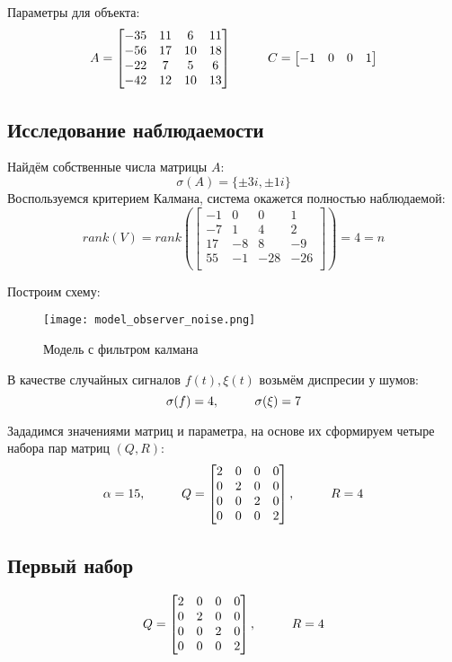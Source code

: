 Параметры для объекта:
$$
  A = \begin{bmatrix}
    -35 & 11 & 6 & 11 \\
    -56 & 17 & 10 & 18 \\
    -22 & 7 & 5 & 6 \\
    -42 & 12 & 10 & 13 \\
\end{bmatrix} \hspace*{1cm}
  C = \begin{bmatrix}
    -1 & 0 & 0 & 1 \\
\end{bmatrix}
$$

\subsection{Исследование наблюдаемости}
Найдём собственные числа матрицы $A$:
$$
    \sigma(A) = \{ \pm 3i, \pm 1i \}
$$
Воспользуемся критерием Калмана, система окажется полностью наблюдаемой:
$$
  rank(V) = rank(\begin{bmatrix}
    -1 & 0 & 0 & 1 \\
    -7 & 1 & 4 & 2 \\
    17 & -8 & 8 & -9 \\
    55 & -1 & -28 & -26 \\
\end{bmatrix}) = 4 = n
$$

Построим схему:

\begin{figure}[ht]
  \centering
  \texttt{[image: model\_observer\_noise.png]}
  \caption{Модель с фильтром калмана}
\end{figure}

В качестве случайных сигналов $f(t), \xi(t)$ возьмём диспресии у шумов:
$$
  \sigma(f) = 4,\hspace*{1cm} \sigma(\xi) = 7
$$

Зададимся значениями матриц и параметра, на основе их сформируем четыре набора пар матриц $(Q,R)$:
$$
  \alpha = 15, \hspace*{1cm} Q = \begin{bmatrix}
                        2 & 0 & 0 & 0\\
                        0 & 2 & 0 & 0\\
                        0 & 0 & 2 & 0\\
                        0 & 0 & 0 & 2
                      \end{bmatrix}, \hspace*{1cm} R=4
$$


\subsection{Первый набор}
$$
  Q = \begin{bmatrix}
                    2 & 0 & 0 & 0\\
                    0 & 2 & 0 & 0\\
                    0 & 0 & 2 & 0\\
                    0 & 0 & 0 & 2
                      \end{bmatrix}, \hspace*{1cm} R=4
$$

